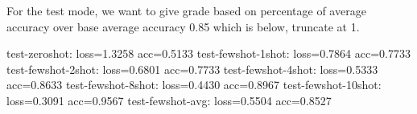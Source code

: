 \begin{Q}
\begin{enumerate}
\begin{solution}
\bigskip

For the test mode, we want to give grade based on percentage of average accuracy over base average accuracy 0.85 which is below, truncate at 1.

test-zeroshot: loss=1.3258 acc=0.5133
test-fewshot-1shot: loss=0.7864 acc=0.7733
test-fewshot-2shot: loss=0.6801 acc=0.7733
test-fewshot-4shot: loss=0.5333 acc=0.8633
test-fewshot-8shot: loss=0.4430 acc=0.8967
test-fewshot-10shot: loss=0.3091 acc=0.9567
test-fewshot-avg: loss=0.5504 acc=0.8527



\end{solution}

\end{enumerate}
\end{Q}
